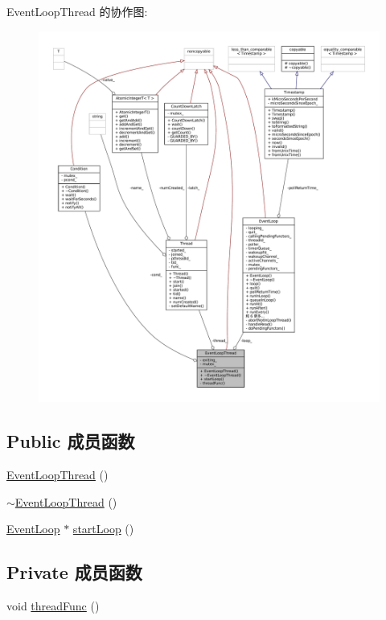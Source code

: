 Event\+Loop\+Thread 的协作图\+:
\nopagebreak
\begin{figure}[H]
\begin{center}
\leavevmode
\includegraphics[width=350pt]{classmuduo_1_1EventLoopThread__coll__graph}
\end{center}
\end{figure}
\subsection*{Public 成员函数}
\begin{DoxyCompactItemize}
\item 
\hyperlink{classmuduo_1_1EventLoopThread_aa866d54bfe4557884ede5d7800865753}{Event\+Loop\+Thread} ()
\item 
\hyperlink{classmuduo_1_1EventLoopThread_af946ac1087e0c7617b0704ebde55332c}{$\sim$\+Event\+Loop\+Thread} ()
\item 
\hyperlink{classmuduo_1_1EventLoop}{Event\+Loop} $\ast$ \hyperlink{classmuduo_1_1EventLoopThread_a223c4c7a43f7d8c3e41071315efa78d1}{start\+Loop} ()
\end{DoxyCompactItemize}
\subsection*{Private 成员函数}
\begin{DoxyCompactItemize}
\item 
void \hyperlink{classmuduo_1_1EventLoopThread_a539feb3c59a20db3b260b312fa7dea34}{thread\+Func} ()
\end{DoxyCompactItemize}
